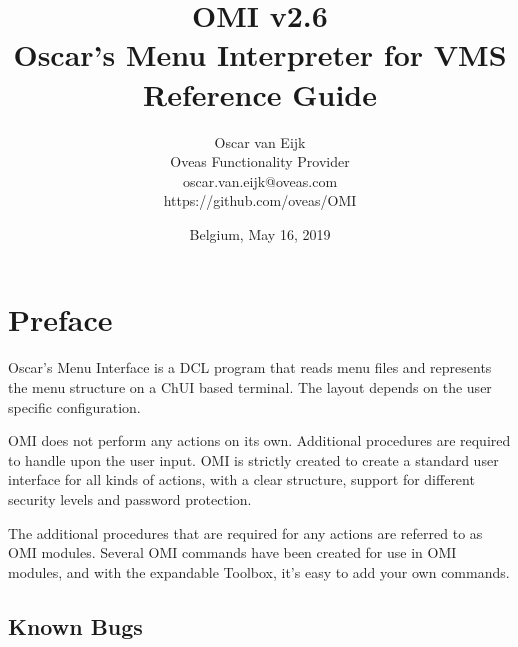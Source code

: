 \documentclass[a4paper]{book}
\newcommand{\vs}{\vspace{3mm}}
\begin{document}
\title{
OMI v2.6\\
Oscar's Menu Interpreter for VMS\\
Reference Guide}

\author{
Oscar van Eijk\\
Oveas Functionality Provider\\
oscar.van.eijk@oveas.com\\
https://github.com/oveas/OMI}

\date{Belgium, May 16, 2019}

\maketitle

\tableofcontents
\listoffigures
\listoftables

\setcounter{page}{1}
\chapter*{Preface}
\label{sec:introductione}

Oscar's Menu Interface is a DCL program that reads menu files and 
represents the menu structure on a ChUI based terminal. The layout depends 
on the user specific configuration.

\vs

OMI does not perform any actions on its own. Additional procedures are 
required to handle upon the user input. OMI is strictly created to create a 
standard user interface for all kinds of actions, with a clear structure, 
support for different security levels and password protection.

\vs

The additional procedures that are required for any actions are referred to 
as OMI modules. Several OMI commands have been created for use in OMI 
modules, and with the expandable Toolbox, it's easy to add your own 
commands.

\section*{Known Bugs}
\label{subsec:known}
\end{document}
